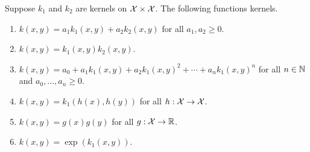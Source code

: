 Suppose \(k_1\) and \(k_2\) are kernels on \(\mathcal{X} \times \mathcal{X}\).
The following functions kernels.
\begin{enumerate}
    \item \(k(x,y) = a_1 k_1(x,y) + a_2 k_2(x,y)\) for all \(a_1, a_2 \geq 0\).
    \item \(k(x,y) = k_1(x,y) k_2(x,y)\).
    \item \(k(x,y) = a_0 + a_1 k_1(x,y) + a_2 k_1(x,y)^2 + \cdots + a_n k_1(x,y)^n\) for all \(n \in \mathbb{N}\) and \(a_0, \dots, a_n \geq 0\).
    \item \(k(x,y) = k_1(h(x),h(y))\) for all \(h : \mathcal{X} \to \mathcal{X}\).
    \item \(k(x,y) = g(x)g(y)\) for all \(g : \mathcal{X} \to \mathbb{R}\).
    \item \(k(x,y) = \exp(k_1(x,y))\).
\end{enumerate}